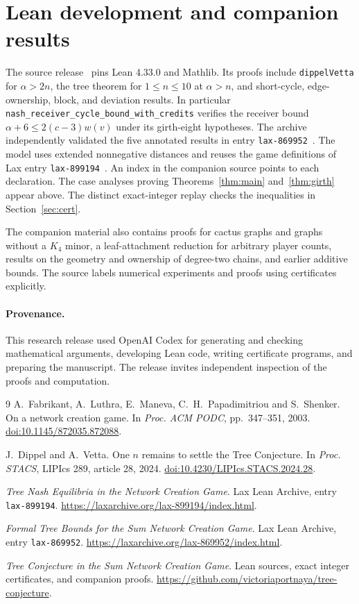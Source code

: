 \documentclass[11pt]{article}
\begin{document}
\section{Lean development and companion results}

The source release~\cite{release} pins Lean 4.33.0 and Mathlib.
Its proofs include \texttt{dippelVetta} for \(\alpha>2n\), the
tree theorem for \(1\le n\le10\) at \(\alpha>n\), and short-cycle,
edge-ownership, block, and deviation results. In particular
\nolinkurl{nash_receiver_cycle_bound_with_credits} verifies
the receiver bound \(\alpha+6\le 2(c-3)w(v)\) under its
girth-eight hypotheses. The archive independently validated the five
annotated results in entry \texttt{lax-869952}~\cite{laxformal}.
The model uses extended nonnegative distances and reuses the game
definitions of Lax entry
\texttt{lax-899194}~\cite{laxgame}. An index in the companion
source points to each declaration. The case analyses proving
Theorems~\ref{thm:main} and~\ref{thm:girth} appear above.
The distinct exact-integer replay checks the inequalities in
Section~\ref{sec:cert}.

The companion material also contains proofs for cactus graphs
and graphs without a \(K_4\) minor, a leaf-attachment reduction
for arbitrary player counts, results on the geometry and
ownership of degree-two chains, and earlier additive bounds.
The source labels numerical experiments and proofs using
certificates explicitly.

\paragraph{Provenance.}
This research release used OpenAI Codex for generating and
checking mathematical arguments, developing Lean code, writing
certificate programs, and preparing the manuscript. The release
invites independent inspection of the proofs and computation.

\begin{thebibliography}{9}
A.~Fabrikant, A.~Luthra, E.~Maneva, C.~H.~Papadimitriou and S.~Shenker.
On a network creation game.
In \emph{Proc. ACM PODC}, pp.~347--351, 2003.
\href{https://doi.org/10.1145/872035.872088}{doi:10.1145/872035.872088}.

J.~Dippel and A.~Vetta.
One \(n\) remains to settle the Tree Conjecture.
In \emph{Proc. STACS}, LIPIcs 289, article 28, 2024.
\href{https://doi.org/10.4230/LIPIcs.STACS.2024.28}{doi:10.4230/LIPIcs.STACS.2024.28}.

\emph{Tree Nash Equilibria in the Network Creation Game}.
Lax Lean Archive, entry \texttt{lax-899194}.
\url{https://laxarchive.org/lax-899194/index.html}.

\emph{Formal Tree Bounds for the Sum Network Creation Game}.
Lax Lean Archive, entry \texttt{lax-869952}.
\url{https://laxarchive.org/lax-869952/index.html}.

\emph{Tree Conjecture in the Sum Network Creation Game}.
Lean sources, exact integer certificates, and companion proofs.
\url{https://github.com/victoriaportnaya/tree-conjecture}.
\end{thebibliography}
\end{document}
